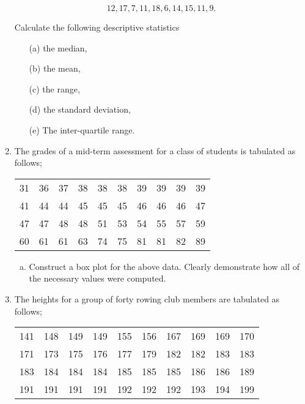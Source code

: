 \documentclass[a4paper,12pt]{article}
\begin{document}
\begin{enumerate}
	\[12, 17, 7, 11, 18, 6, 14, 15, 11, 9.\]
	
	Calculate the following descriptive statistics

	\begin{itemize}   
		\item[(a)] the median,    
		\item[(b)] the mean,     
		\item[(c)] the range,    
		\item[(d)] the standard deviation, 
		\item[(e)] The inter-quartile range.
	\end{itemize}

	
\item 
The grades of a mid-term assessment for a class of students is tabulated as follows;
\begin{table}[ht]
\begin{center}
\begin{tabular}{|rrrrrrrrrr|}
\hline
31 & 36 & 37 & 38 & 38 & 38 & 39 & 39 & 39 & 39 \\
41 & 44 & 44 & 45 & 45 & 45 & 46 & 46 & 46 & 47 \\
47 & 47 & 48 & 48 & 51 & 53 & 54 & 55 & 57 & 59 \\
60 & 61 & 61 & 63 & 74 & 75 & 81 & 81 & 82 & 89 \\
\hline
\end{tabular}
\end{center}
\end{table}
\begin{enumerate}[(a)]
\item Construct a box plot for the above data. Clearly demonstrate how all of the necessary values were computed.
\end{enumerate}
\item 
The heights for a group of forty rowing club members are tabulated as follows;
\begin{table}[ht]
\begin{center}
\begin{tabular}{|rrrrrrrrrr|}
\hline
141 & 148 & 149 & 149 & 155 & 156 & 167 & 169 & 169 & 170 \\
171 & 173 & 175 & 176 & 177 & 179 & 182 & 182 & 183 & 183 \\
183 & 184 & 184 & 184 & 185 & 185 & 185 & 186 & 186 & 189 \\
191 & 191 & 191 & 191 & 192 & 192 & 192 & 193 & 194 & 199 \\
\hline
\end{tabular}
\end{center}
\end{table}
\begin{enumerate}[(a)]


\end{enumerate}
\end{enumerate}
\end{document}
